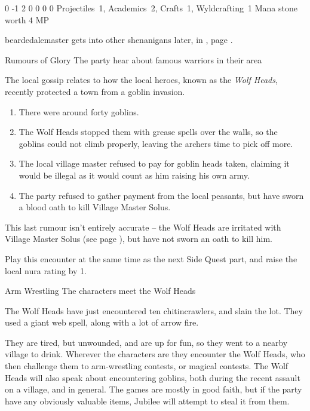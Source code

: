 \begin{multicols}{2}
{0}%
{-1}%
{{2}%
{0}%
{0}}%
{0}%
{0}%
{Projectiles~1, Academics~2, Crafts~1, Wyldcrafting~1\knacks{\combatcaster}
}%
{Mana stone worth 4 MP}%
{}

\beardedalemaster
\label{beardedalemaster}

\Gls{beardedalemaster} gets into other shenanigans later, in , page \pageref{troubleAle}.

{\N Rumours of Glory}%
{The party hear about famous warriors in their area}%

The local gossip relates to how the local heroes, known as the \textit{Wolf Heads}, recently protected a town from a goblin invasion.

\begin{enumerate}

	\item{There were around forty goblins.}
	\item{The Wolf Heads stopped them with grease spells over the walls, so the goblins could not climb properly, leaving the archers time to pick off more.}
	\item{The local village master refused to pay for goblin heads taken, claiming it would be illegal as it would count as him raising his own army.}
	\item{The party refused to gather payment from the local peasants, but have sworn a blood oath to kill Village Master Solus.}
\end{enumerate}

This last rumour isn't entirely accurate -- the Wolf Heads are irritated with Village Master Solus (see page \pageref{solus}), but have not sworn an oath to kill him.

Play this encounter at the same time as the next Side Quest part, and raise the local nura rating by 1.

{Arm Wrestling}%
{The characters meet the Wolf Heads}%

The Wolf Heads have just encountered ten chitincrawlers, and slain the lot.
They used a giant web spell, along with a lot of arrow fire.

They are tired, but unwounded, and are up for fun, so they went to a nearby village to drink.
Wherever the characters are they encounter the Wolf Heads, who then challenge them to arm-wrestling contests, or magical contests.
The Wolf Heads will also speak about encountering goblins, both during the recent assault on a village, and in general.
The games are mostly in good faith, but if the party have any obviously valuable items, Jubilee will attempt to steal it from them.


\end{multicols}
